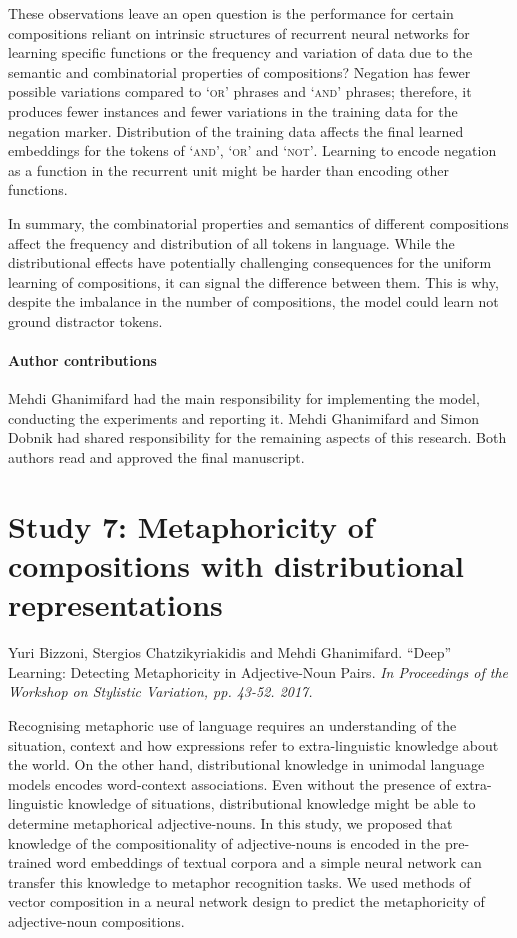 These observations leave an open question \textemdash is the performance for certain compositions reliant on intrinsic structures of recurrent neural networks for learning specific functions or the frequency and variation of data due to the semantic and combinatorial properties of compositions? 
Negation has fewer possible variations compared to \textsc{`or'} phrases and \textsc{`and'} phrases; 
therefore, it produces fewer instances and fewer variations in the training data for the negation marker. 
Distribution of the training data affects the final learned embeddings for the tokens of \textsc{`and'}, \textsc{`or'} and \textsc{`not'}. 
Learning to encode negation as a function in the recurrent unit might be harder than encoding other functions. 

In summary, the combinatorial properties and semantics of different compositions affect the frequency and distribution of all tokens in language. 
While the distributional effects have potentially challenging consequences for the uniform learning of compositions, it can signal the difference between them.
This is why, despite the imbalance in the number of compositions, the model could learn not ground distractor tokens.%

\paragraph{Author contributions}
Mehdi Ghanimifard had the main responsibility for implementing the model, conducting the experiments and reporting it. Mehdi Ghanimifard and Simon Dobnik had shared responsibility for the remaining aspects of this research. Both authors read and approved the final manuscript.

\section{Study 7: Metaphoricity of compositions with distributional representations}
Yuri Bizzoni, Stergios Chatzikyriakidis and Mehdi Ghanimifard. 
``Deep'' Learning: Detecting Metaphoricity in Adjective-Noun Pairs.
\textit{In Proceedings of the Workshop on Stylistic Variation, pp. 43-52. 2017.}

Recognising metaphoric use of language requires an understanding of the situation, context and how expressions refer to extra-linguistic knowledge about the world. 
On the other hand, distributional knowledge in unimodal language models encodes word-context associations. 
Even without the presence of extra-linguistic knowledge of situations, distributional knowledge might be able to determine metaphorical adjective-nouns. 
In this study, we proposed that knowledge of the compositionality of adjective-nouns is encoded in the pre-trained word embeddings of textual corpora and a simple neural network can transfer this knowledge to metaphor recognition tasks. 
We used methods of vector composition in a neural network design to predict the metaphoricity of adjective-noun compositions.


